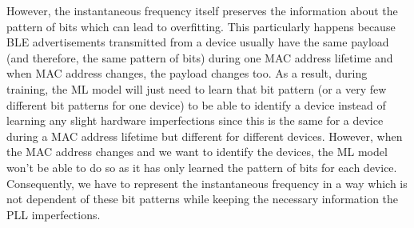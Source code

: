 However, the instantaneous frequency itself preserves the information about the pattern of bits which can lead to overfitting. This particularly happens because BLE advertisements transmitted from a device usually have the same payload (and therefore, the same pattern of bits) during one MAC address lifetime and when MAC address changes, the payload changes too. As a result, during training, the ML model will just need to learn that bit pattern (or a very few different bit patterns for one device) to be able to identify a device instead of learning any slight hardware imperfections since this is the same for a device during a MAC address lifetime but different for different devices. However, when the MAC address changes and we want to identify the devices, the ML model won't be able to do so as it has only learned the pattern of bits for each device. Consequently, we have to represent the instantaneous frequency in a way which is not dependent of these bit patterns while keeping the necessary information the PLL imperfections.


